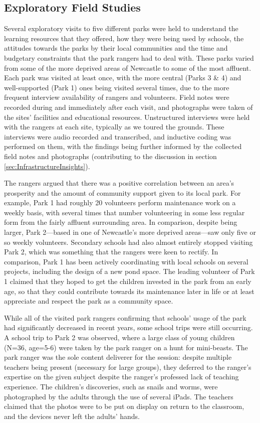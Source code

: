 \subsection{Exploratory Field Studies}
Several exploratory visits to five different parks were held to understand the learning resources that they offered, how they were being used by schools, the attitudes towards the parks by their local communities and the time and budgetary constraints that the park rangers had to deal with. These parks varied from some of the more deprived areas of Newcastle to some of the most affluent. Each park was visited at least once, with the more central (Parks 3 \& 4) and well-supported (Park 1) ones being visited several times, due to the more frequent interview availability of rangers and volunteers. Field notes were recorded during and immediately after each visit, and photographs were taken of the sites' facilities and educational resources. Unstructured interviews were held with the rangers at each site, typically as we toured the grounds. These interviews were audio recorded and transcribed, and inductive coding was performed on them, with the findings being further informed by the collected field notes and photographs (contributing to the discussion in section \ref{sec:InfrastructureInsights}).

The rangers argued that there was a positive correlation between an area’s prosperity and the amount of community support given to its local park. For example, Park 1 had roughly 20 volunteers perform maintenance work on a weekly basis, with several times that number volunteering in some less regular form from the fairly affluent surrounding area. In comparison, despite being larger, Park 2---based in one of Newcastle’s more deprived areas---saw only five or so weekly volunteers. Secondary schools had also almost entirely stopped visiting Park 2, which was something that the rangers were keen to rectify. In comparison, Park 1 has been actively coordinating with local schools on several projects, including the design of a new pond space. The leading volunteer of Park 1 claimed that they hoped to get the children invested in the park from an early age, so that they could contribute towards its maintenance later in life or at least appreciate and respect the park as a community space. 

While all of the visited park rangers confirming that schools’ usage of the park had significantly decreased in recent years, some school trips were still occurring. A school trip to Park 2 was observed, where a large class of young children (N=36, age=5-6) were taken by the park ranger on a hunt for mini-beasts. The park ranger was the sole content deliverer for the session: despite multiple teachers being present (necessary for large groups), they deferred to the ranger's expertise on the given subject despite the ranger's professed lack of teaching experience. The children's discoveries, such as snails and worms, were photographed by the adults through the use of several iPads. The teachers claimed that the photos were to be put on display on return to the classroom, and the devices never left the adults' hands.

